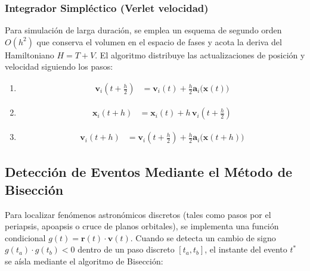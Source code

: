 \documentclass[11pt, a4paper]{article}
\begin{document}
	\subsubsection{Integrador Simpléctico (Verlet velocidad)}
	Para simulación de larga duración, se emplea un esquema de segundo orden $O(h^2)$ que conserva el volumen en el espacio de fases y acota la deriva del Hamiltoniano $H = T + V$. El algoritmo distribuye las actualizaciones de posición y velocidad siguiendo los pasos:
	
	\begin{enumerate}
		\item
		\begin{equation}
			\begin{aligned}
				\mathbf{v}_i\left(t + \frac{h}{2}\right)
				&= \mathbf{v}_i(t)
				+ \frac{h}{2}\mathbf{a}_i\bigl(\mathbf{x}(t)\bigr)
			\end{aligned}
		\end{equation}
		
		\item
		\begin{equation}
			\begin{aligned}
				\mathbf{x}_i(t+h)
				&= \mathbf{x}_i(t)
				+ h\,\mathbf{v}_i\left(t+\frac{h}{2}\right)
			\end{aligned}
		\end{equation}
		
		\item
		\begin{equation}
			\begin{aligned}
				\mathbf{v}_i(t+h)
				&= \mathbf{v}_i\left(t+\frac{h}{2}\right)
				+ \frac{h}{2}\mathbf{a}_i\bigl(\mathbf{x}(t+h)\bigr)
			\end{aligned}
		\end{equation}
		
		
	\end{enumerate}
	
	\subsection{Detección de Eventos Mediante el Método de Bisección}
	
	Para localizar fenómenos astronómicos discretos (tales como pasos por el periapsis, apoapsis o cruce de planos orbitales), se implementa una función condicional $g(t) = \mathbf{r}(t) \cdot \mathbf{v}(t)$. Cuando se detecta un cambio de signo $g(t_a) \cdot g(t_b) < 0$ dentro de un paso discreto $[t_a, t_b]$, el instante del evento $t^*$ se aísla mediante el algoritmo de Bisección:
	
\end{document}
